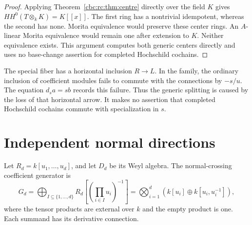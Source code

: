 \begin{proof}
Applying Theorem~\ref{cbc:rc:thm:centre} directly over the field \(K\)
gives \(HH^0(T\otimes_k K)=K[[x]]\).
The first ring has a nontrivial idempotent, whereas the second has
none.  Morita equivalence would preserve these center rings. An
\(A\)-linear Morita equivalence would remain one after extension to
\(K\).  Neither equivalence exists.  This argument computes both
generic centers directly and uses no base-change assertion for
completed Hochschild cochains.
\end{proof}

The special fiber has a horizontal inclusion \(R\to L\).
In the family, the ordinary inclusion of coefficient modules fails to
commute with the connections by \(-s/u\). The equation \(d_s a=s b\)
records this failure.  Thus the generic splitting is caused by the loss
of that horizontal arrow.  It makes no assertion that completed
Hochschild cochains commute with specialization in \(s\).

\section{Independent normal directions}
\label{cbc:rc:subsec:crossings}

Let \(R_d=k[u_1,\ldots,u_d]\), and let \(D_d\) be its Weyl algebra.
The normal-crossing coefficient generator is
\[
 G_d=\bigoplus_{I\subseteq\{1,\ldots,d\}}
 R_d\left[\left(\prod_{i\in I}u_i\right)^{-1}\right]
 =\bigotimes_{i=1}^d(k[u_i]\oplus k[u_i,u_i^{-1}]),
\]
where the tensor products are external over \(k\) and the empty product
is one.  Each summand has its derivative connection.

